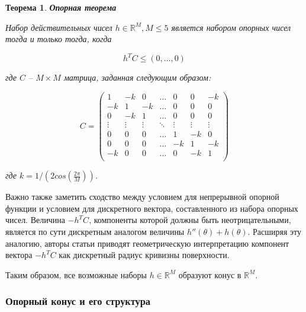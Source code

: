 \documentclass[a4paper, 12pt, titlepage]{article}
\theoremstyle{definition}
\theoremstyle{plain}
\newtheorem{SmartTheorem}{Теорема}
\begin{document}
\begin{SmartTheorem}
 \label{thm:support-vector-criterion}
 \textbf{Опорная теорема}

 Набор действительных чисел $h \in \mathbb{R}^{M}, M \leq 5$ является набором
 опорных чисел тогда и только тогда, когда

 \begin{equation}
  h^{T} C \leq (0, \ldots, 0)
 \end{equation}

 где $C$ -- $M \times M$ матрица, заданная следующим образом:

 \begin{equation}
  C = 
  \left(
  \begin{array}{ccccccc}
       1 &     -k &      0 & \ldots &      0 &      0 &     -k \\
      -k &      1 &     -k & \ldots &      0 &      0 &      0 \\
       0 &     -k &      1 & \ldots &      0 &      0 &      0 \\
  \vdots & \vdots & \vdots & \ddots & \vdots & \vdots & \vdots \\
       0 &      0 &      0 & \ldots &      1 &     -k &      0 \\
       0 &      0 &      0 & \ldots &     -k &      1 &     -k \\
      -k &      0 &      0 & \ldots &      0 &     -k &      1 \\
  \end{array}
  \right)
 \end{equation}

 где $k = 1 / (2 cos(\frac{2 \pi}{M}))$.
\end{SmartTheorem}

Важно также заметить сходство между условием для непрерывной опорной функции и
условием для дискретного вектора, составленного из набора опорных чисел.
Величина $ - h^{T} C$, компоненты которой должны быть неотрицательными, является
по сути дискретным аналогом величины $h''(\theta) + h(\theta)$. Расширяя эту
аналогию, авторы статьи приводят геометрическую интерпретацию компонент вектора
$ - h^{T} C$ как дискретный радиус кривизны поверхности.

Таким образом, все возможные наборы $h \in \mathbb{R}^{M}$ образуют конус в
$\mathbb{R}^{M}$.

\subsubsection{Опорный конус и его структура}
\label{sec:history/PrinceW90/support-cone}
\end{document}
